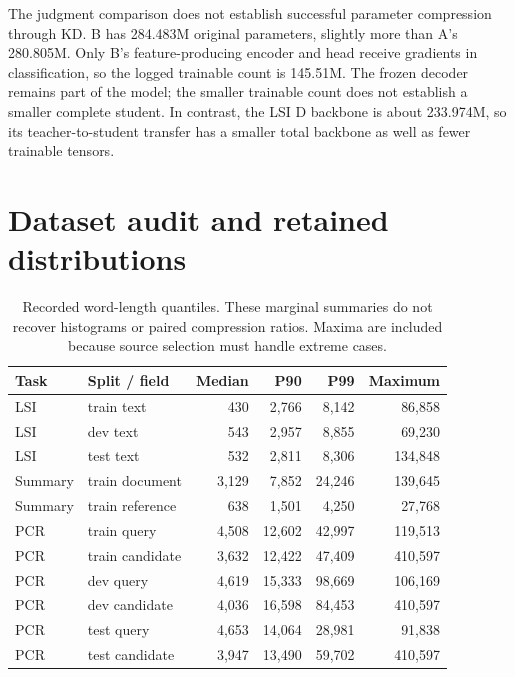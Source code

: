 The judgment comparison does not establish successful parameter compression through KD. B has
284.483M original parameters, slightly more than A's 280.805M. Only B's feature-producing encoder and
head receive gradients in classification, so the logged trainable count is 145.51M. The frozen decoder remains part of the model; the smaller trainable count does not establish a smaller complete student.
In contrast, the LSI D backbone is about 233.974M, so its teacher-to-student transfer has a smaller total
backbone as well as fewer trainable tensors.

\section{Dataset audit and retained distributions}
\label{app:data}
\begin{table}[H]\centering\small
\caption{Recorded word-length quantiles. These marginal summaries do not recover histograms or paired
compression ratios. Maxima are included because source selection must handle extreme cases.}
\begin{tabular}{llrrrr}
\toprule Task & Split / field & Median & P90 & P99 & Maximum\\\midrule
LSI & train text & 430 & 2,766 & 8,142 & 86,858\\
LSI & dev text & 543 & 2,957 & 8,855 & 69,230\\
LSI & test text & 532 & 2,811 & 8,306 & 134,848\\
Summary & train document & 3,129 & 7,852 & 24,246 & 139,645\\
Summary & train reference & 638 & 1,501 & 4,250 & 27,768\\
PCR & train query & 4,508 & 12,602 & 42,997 & 119,513\\
PCR & train candidate & 3,632 & 12,422 & 47,409 & 410,597\\
PCR & dev query & 4,619 & 15,333 & 98,669 & 106,169\\
PCR & dev candidate & 4,036 & 16,598 & 84,453 & 410,597\\
PCR & test query & 4,653 & 14,064 & 28,981 & 91,838\\
PCR & test candidate & 3,947 & 13,490 & 59,702 & 410,597\\\bottomrule
\end{tabular}\end{table}

